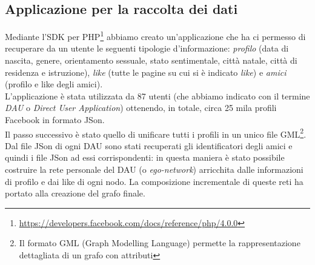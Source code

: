 \subsection{Applicazione per la raccolta dei dati}
Mediante l'SDK per PHP\footnote{\url{https://developers.facebook.com/docs/reference/php/4.0.0}} abbiamo creato un'applicazione che ha ci permesso di recuperare da un utente le seguenti tipologie d'informazione: \textit{profilo} (data di nascita, genere, orientamento sessuale, stato sentimentale, citt\`a natale, citt\`a di residenza  e istruzione), \textit{like} (tutte le pagine su cui si \`e indicato \textit{like}) e \textit{amici} (profilo e like degli amici).\\
L'applicazione \`e stata utilizzata da 87 utenti (che abbiamo indicato con il termine \textit{DAU} o \textit{Direct User Application}) ottenendo, in totale, circa 25 mila profili Facebook in formato JSon.\\
Il passo successivo \`e stato quello di unificare tutti i profili in un unico file GML\footnote{Il formato GML (Graph Modelling Language) permette la rappresentazione dettagliata di un grafo con attributi}. Dal file JSon di ogni DAU sono stati recuperati gli identificatori degli amici e quindi i file JSon ad essi corrispondenti: in questa maniera \`e stato possibile costruire la rete personale del DAU (o \textit{ego-network}) arricchita dalle informazioni di profilo e dai like di ogni nodo. La composizione incrementale di queste reti ha portato alla creazione del grafo finale.


